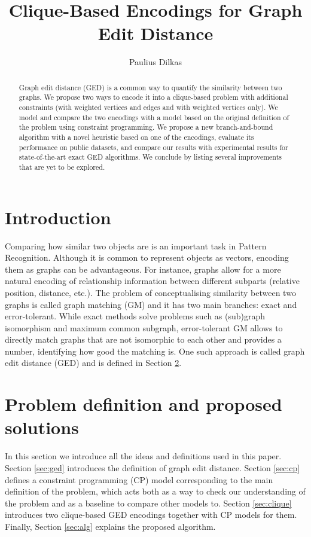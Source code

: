 \documentclass{article}
\author{Paulius Dilkas}
\title{Clique-Based Encodings for Graph Edit Distance}
\theoremstyle{definition}
\begin{document}
\maketitle
\begin{abstract}
  Graph edit distance (GED) is a common way to quantify the similarity between two graphs. We propose two ways to encode it into a clique-based problem with additional constraints (with weighted vertices and edges and with weighted vertices only). We model and compare the two encodings with a model based on the original definition of the problem using constraint programming. We propose a new branch-and-bound algorithm with a novel heuristic based on one of the encodings, evaluate its performance on public datasets, and compare our results with experimental results for state-of-the-art exact GED algorithms. We conclude by listing several improvements that are yet to be explored.
\end{abstract}
\section{Introduction}
Comparing how similar two objects are is an important task in Pattern Recognition. Although it is common to represent objects as vectors, encoding them as graphs can be advantageous. For instance, graphs allow for a more natural encoding of relationship information between different subparts (relative position, distance, etc.). The problem of conceptualising similarity between two graphs is called graph matching (GM) and it has two main branches: exact and error-tolerant. While exact methods solve problems such as (sub)graph isomorphism and maximum common subgraph, error-tolerant GM allows to directly match graphs that are not isomorphic to each other and provides a number, identifying how good the matching is. One such approach is called graph edit distance (GED) and is defined in Section \ref{sec:2}.
\section{Problem definition and proposed solutions}
\label{sec:2}
In this section we introduce all the ideas and definitions used in this paper. Section \ref{sec:ged} introduces the definition of graph edit distance. Section \ref{sec:cp} defines a constraint programming (CP) model corresponding to the main definition of the problem, which acts both as a way to check our understanding of the problem and as a baseline to compare other models to. Section \ref{sec:clique} introduces two clique-based GED encodings together with CP models for them. Finally, Section \ref{sec:alg} explains the proposed algorithm.
\end{document}
